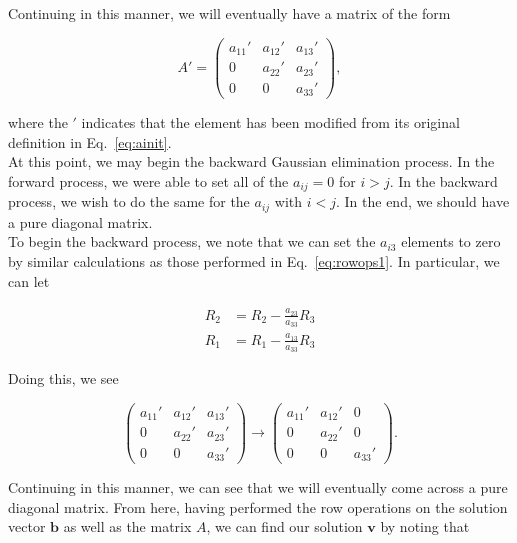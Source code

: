 \documentclass[12pt]{article}
\numberwithin{equation}{section}
\begin{document}
\noindent Continuing in this manner, we will eventually have a matrix of the form 

\begin{equation}
A\prime = \left(
\begin{array}{ccc}
a_{11}\prime & a_{12}\prime & a_{13}\prime \\
0 & a_{22}\prime & a_{23}\prime \\
0 & 0 & a_{33}\prime
\end{array}\right),
\end{equation}

\noindent where the $\prime$ indicates that the element has been modified from its original definition in Eq.~\ref{eq:ainit}.  
\\\indent At this point, we may begin the backward Gaussian elimination process.  In the forward process, we were able to set all of the $a_{ij}=0$ for $i>j$.  In the backward process, we wish to do the same for the $a_{ij}$ with $i<j$.  In the end, we should have a pure diagonal matrix.
\\\indent To begin the backward process, we note that we can set the $a_{i3}$ elements to zero by similar calculations as those performed in Eq.~\ref{eq:rowops1}.  In particular, we can let 

\begin{equation}
\label{eq:rowops2}
\begin{align}
R_{2} &= R_{2} - \frac{a_{23}}{a_{33}}R_{3} \\
R_{1} &= R_{1} - \frac{a_{13}}{a_{33}}R_{3}
\end{align}
\end{equation}

\noindent Doing this, we see 

$$\left(
\begin{array}{ccc}
a_{11}\prime & a_{12}\prime & a_{13}\prime \\
0 & a_{22}\prime & a_{23}\prime \\
0 & 0 & a_{33}\prime
\end{array}\right) \rightarrow
\left(\begin{array}{ccc}
a_{11}\prime & a_{12}\prime & 0 \\
0 & a_{22}\prime & 0 \\
0 & 0 & a_{33}\prime 
\end{array}\right).$$

\noindent Continuing in this manner, we can see that we will eventually come across a pure diagonal matrix.  From here, having performed the row operations on the solution vector $\textbf{b}$ as well as the matrix $A$, we can find our solution $\textbf{v}$ by noting that 
\end{document}
